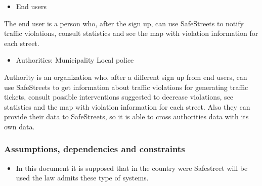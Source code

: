 \begin{itemize}
	\item End users
\end{itemize}

The end user is a person who, after the sign up, can use SafeStreets to notify traffic violations, consult statistics and see the map with violation information for each street.

\begin{itemize}
	\item Authorities:
	\subitem Municipality
	\subitem Local police
\end{itemize}


Authority is an organization who, after a different sign up from end users, can use SafeStreets to get information about traffic violations for generating traffic tickets, consult possible interventions suggested to decrease violations, see statistics and the map with violation information for each street.
Also they can provide their data to SafeStreets, so it is able to cross authorities data with its own data.

\subsubsection{Assumptions, dependencies and constraints}

\begin{itemize}
	\item 
	In this document it is supposed that in the country were Safestreet will be used the law admits these type of systems.
\end{itemize}



